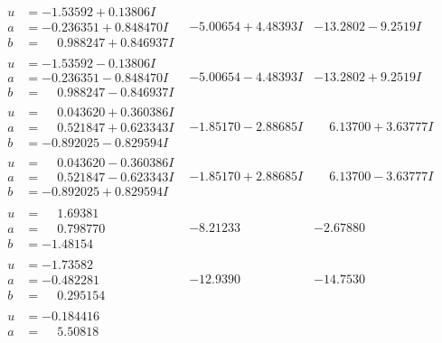 \documentclass[1p]{elsarticle_modified}
\theoremstyle{definition}
\begin{document}
$$\begin{array}{c|c|c}
\begin{aligned}
u &= -1.53592 + 0.13806 I \\
a &= -0.236351 + 0.848470 I \\
b &= \phantom{-}0.988247 + 0.846937 I\end{aligned}
 & -5.00654 + 4.48393 I & -13.2802 - 9.2519 I \\ \hline\begin{aligned}
u &= -1.53592 - 0.13806 I \\
a &= -0.236351 - 0.848470 I \\
b &= \phantom{-}0.988247 - 0.846937 I\end{aligned}
 & -5.00654 - 4.48393 I & -13.2802 + 9.2519 I \\ \hline\begin{aligned}
u &= \phantom{-}0.043620 + 0.360386 I \\
a &= \phantom{-}0.521847 + 0.623343 I \\
b &= -0.892025 - 0.829594 I\end{aligned}
 & -1.85170 - 2.88685 I & \phantom{-}6.13700 + 3.63777 I \\ \hline\begin{aligned}
u &= \phantom{-}0.043620 - 0.360386 I \\
a &= \phantom{-}0.521847 - 0.623343 I \\
b &= -0.892025 + 0.829594 I\end{aligned}
 & -1.85170 + 2.88685 I & \phantom{-}6.13700 - 3.63777 I \\ \hline\begin{aligned}
u &= \phantom{-}1.69381\phantom{ +0.000000I} \\
a &= \phantom{-}0.798770\phantom{ +0.000000I} \\
b &= -1.48154\phantom{ +0.000000I}\end{aligned}
 & -8.21233\phantom{ +0.000000I} & -2.67880\phantom{ +0.000000I} \\ \hline\begin{aligned}
u &= -1.73582\phantom{ +0.000000I} \\
a &= -0.482281\phantom{ +0.000000I} \\
b &= \phantom{-}0.295154\phantom{ +0.000000I}\end{aligned}
 & -12.9390\phantom{ +0.000000I} & -14.7530\phantom{ +0.000000I} \\ \hline\begin{aligned}
u &= -0.184416\phantom{ +0.000000I} \\
a &= \phantom{-}5.50818\phantom{ +0.000000I} \\

\end{aligned}
\end{array}$$
\end{document}
